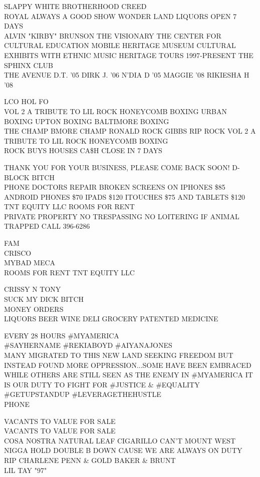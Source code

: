 \documentclass[10pt,letterpaper]{article}
\begin{document}
SLAPPY  WHITE BROTHERHOOD CREED\\
ROYAL ALWAYS A GOOD SHOW WONDER LAND LIQUORS OPEN 7 DAYS\\
ALVIN "KIRBY" BRUNSON THE VISIONARY THE CENTER FOR CULTURAL EDUCATION MOBILE HERITAGE MUSEUM CULTURAL EXHIBITS WITH ETHNIC MUSIC HERITAGE TOURS 1997{-}PRESENT THE SPHINX CLUB\\
THE AVENUE D.T. '05 DIRK J. '06 N'DIA D '05 MAGGIE '08 RIKIESHA H '08

LCO HOL FO\\
VOL 2 A TRIBUTE TO LIL ROCK HONEYCOMB BOXING URBAN BOXING UPTON BOXING BALTIMORE BOXING\\
THE CHAMP BMORE CHAMP RONALD ROCK GIBBS RIP ROCK VOL 2 A TRIBUTE TO LIL ROCK HONEYCOMB BOXING\\
ROCK BUYS HOUSES CA\$H CLOSE IN 7 DAYS

THANK YOU FOR YOUR BUSINESS, PLEASE COME BACK SOON!  D{-}BLOCK BITCH\\
PHONE DOCTORS REPAIR BROKEN SCREENS ON IPHONES \$85 ANDROID PHONES \$70 IPADS \$120 ITOUCHES \$75 AND TABLETS \$120\\
TNT EQUITY LLC ROOMS FOR RENT\\
PRIVATE PROPERTY NO TRESPASSING NO LOITERING IF ANIMAL TRAPPED CALL 396{-}6286

FAM\\
CRISCO\\
MYBAD MECA\\
ROOMS FOR RENT TNT EQUITY LLC

CRISSY N TONY\\
SUCK MY DICK BITCH\\
MONEY ORDERS\\
LIQUORS BEER WINE DELI GROCERY PATENTED MEDICINE

EVERY 28 HOURS \#MYAMERICA\\
\#SAYHERNAME \#REKIABOYD \#AIYANAJONES\\
MANY MIGRATED TO THIS NEW LAND SEEKING FREEDOM BUT INSTEAD FOUND MORE OPPRESSION...SOME HAVE BEEN EMBRACED WHILE OTHERS ARE STILL SEEN AS THE ENEMY IN \#MYAMERICA IT IS OUR DUTY TO FIGHT FOR \#JUSTICE \& \#EQUALITY \#GETUPSTANDUP \#LEVERAGETHEHUSTLE\\
PHONE

VACANTS TO VALUE FOR SALE\\
VACANTS TO VALUE FOR SALE\\
COSA NOSTRA NATURAL LEAF CIGARILLO CAN'T MOUNT WEST NIGGA HOLD DOUBLE B DOWN CAUSE WE ARE ALWAYS ON DUTY RIP CHARLENE PENN \& GOLD BAKER \& BRUNT\\
LIL TAY "97"
\end{document}
